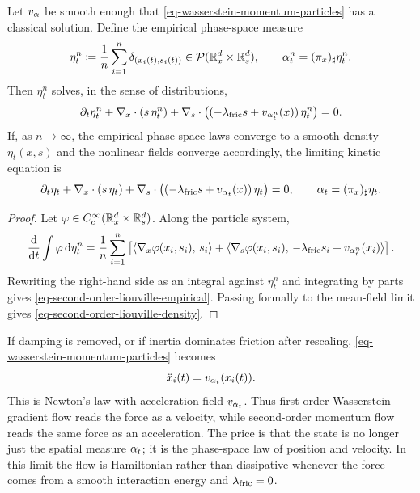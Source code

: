 \begin{prop}\label{prop-second-order-liouville}
	Let $v_\alpha$ be smooth enough that \eqref{eq-wasserstein-momentum-particles} has a classical solution. Define the empirical phase-space measure
	\[
		\eta_t^n \coloneqq \frac1n\sum_{i=1}^n\delta_{(x_i(t),s_i(t))}
		\in \mathcal{P}(\mathbb{R}^d_x\times\mathbb{R}^d_s),
		\qquad
		\alpha_t^n=(\pi_x)_\sharp\eta_t^n.
	\]
	Then $\eta_t^n$ solves, in the sense of distributions,
	\begin{equation}\label{eq-second-order-liouville-empirical}
		\partial_t\eta_t^n
		+
		\nabla_x\cdot(s\,\eta_t^n)
		+
		\nabla_s\cdot\bigl((-\lambda_{\rm fric} s+v_{\alpha_t^n}(x))\,\eta_t^n\bigr)
		=0.
	\end{equation}
	If, as $n\to\infty$, the empirical phase-space laws converge to a smooth density $\eta_t(x,s)$ and the nonlinear fields converge accordingly, the limiting kinetic equation is
	\begin{equation}\label{eq-second-order-liouville-density}
		\partial_t\eta_t
		+
		\nabla_x\cdot(s\,\eta_t)
		+
		\nabla_s\cdot\bigl((-\lambda_{\rm fric} s+v_{\alpha_t}(x))\,\eta_t\bigr)
		=0,
		\qquad
		\alpha_t=(\pi_x)_\sharp\eta_t.
	\end{equation}
\end{prop}
\begin{proof}
	Let $\varphi\in C_c^\infty(\mathbb{R}^d_x\times\mathbb{R}^d_s)$. Along the particle system,
	\[
		\frac{\mathrm{d}}{\mathrm{d} t}
		\int \varphi\,\mathrm{d}\eta_t^n
		=
		\frac1n\sum_{i=1}^n
		\left[
		\langle \nabla_x\varphi(x_i,s_i),\,s_i\rangle
		+
		\langle \nabla_s\varphi(x_i,s_i),\,-\lambda_{\rm fric} s_i+v_{\alpha_t^n}(x_i)\rangle
		\right].
	\]
	Rewriting the right-hand side as an integral against $\eta_t^n$ and integrating by parts gives \eqref{eq-second-order-liouville-empirical}. Passing formally to the mean-field limit gives \eqref{eq-second-order-liouville-density}.
\end{proof}

\begin{rem}\label{rem-newtonian-momentum-limit}
	If damping is removed, or if inertia dominates friction after rescaling, \eqref{eq-wasserstein-momentum-particles} becomes
	\[
		\ddot x_i(t)=v_{\alpha_t}(x_i(t)).
	\]
	This is Newton's law with acceleration field $v_{\alpha_t}$. Thus first-order Wasserstein gradient flow reads the force as a velocity, while second-order momentum flow reads the same force as an acceleration. The price is that the state is no longer just the spatial measure $\alpha_t$; it is the phase-space law of position and velocity. In this limit the flow is Hamiltonian rather than dissipative whenever the force comes from a smooth interaction energy and $\lambda_{\rm fric}=0$.
\end{rem}

